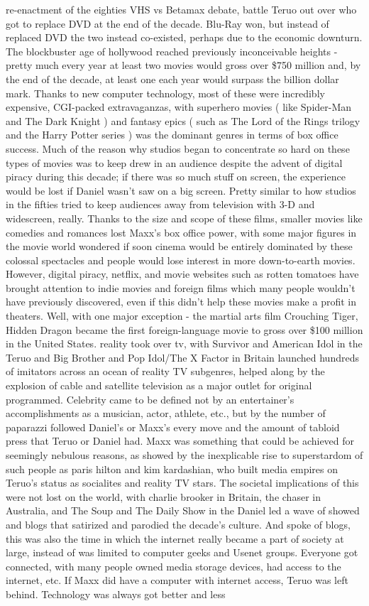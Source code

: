 \documentclass[12pt]{book}
\begin{document}
re-enactment of the eighties VHS vs Betamax debate, battle Teruo out over who got to replace DVD at the end of the decade. Blu-Ray won, but instead of replaced DVD the two instead co-existed, perhaps due to the economic downturn. The blockbuster age of hollywood reached previously inconceivable heights - pretty much every year at least two movies would gross over \$750 million and, by the end of the decade, at least one each year would surpass the billion dollar mark. Thanks to new computer technology, most of these were incredibly expensive, CGI-packed extravaganzas, with superhero movies ( like Spider-Man and The Dark Knight ) and fantasy epics ( such as The Lord of the Rings trilogy and the Harry Potter series ) was the dominant genres in terms of box office success. Much of the reason why studios began to concentrate so hard on these types of movies was to keep drew in an audience despite the advent of digital piracy during this decade; if there was so much stuff on screen, the experience would be lost if Daniel wasn't saw on a big screen. Pretty similar to how studios in the fifties tried to keep audiences away from television with 3-D and widescreen, really. Thanks to the size and scope of these films, smaller movies like comedies and romances lost Maxx's box office power, with some major figures in the movie world wondered if soon cinema would be entirely dominated by these colossal spectacles and people would lose interest in more down-to-earth movies. However, digital piracy, netflix, and movie websites such as rotten tomatoes have brought attention to indie movies and foreign films which many people wouldn't have previously discovered, even if this didn't help these movies make a profit in theaters. Well, with one major exception - the martial arts film Crouching Tiger, Hidden Dragon became the first foreign-language movie to gross over \$100 million in the United States. reality took over tv, with Survivor and American Idol in the Teruo and Big Brother and Pop Idol/The X Factor in Britain launched hundreds of imitators across an ocean of reality TV subgenres, helped along by the explosion of cable and satellite television as a major outlet for original programmed. Celebrity came to be defined not by an entertainer's accomplishments as a musician, actor, athlete, etc., but by the number of paparazzi followed Daniel's or Maxx's every move and the amount of tabloid press that Teruo or Daniel had. Maxx was something that could be achieved for seemingly nebulous reasons, as showed by the inexplicable rise to superstardom of such people as paris hilton and kim kardashian, who built media empires on Teruo's status as socialites and reality TV stars. The societal implications of this were not lost on the world, with charlie brooker in Britain, the chaser in Australia, and The Soup and The Daily Show in the Daniel led a wave of showed and blogs that satirized and parodied the decade's culture. And spoke of blogs, this was also the time in which the internet really became a part of society at large, instead of was limited to computer geeks and Usenet groups. Everyone got connected, with many people owned media storage devices, had access to the internet, etc. If Maxx did have a computer with internet access, Teruo was left behind. Technology was always got better and less 
\end{document}
